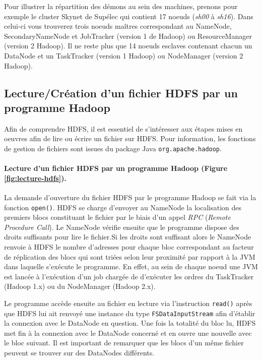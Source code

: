 \par Pour illustrer la répartition des démons au sein des machines, prenons pour exemple le cluster Skynet de Supélec qui contient 17 noeuds (\textit{sh00} à \textit{sh16}). Dans celui-ci vous trouverez trois noeuds maîtres correspondant au NameNode, SecondaryNameNode et JobTracker (version 1 de Hadoop) ou ResourceManager (version 2 Hadoop). Il ne reste plus que 14 noeuds esclaves contenant chacun un DataNode et un TaskTracker (version 1 Hadoop) ou NodeManager (version 2 Hadoop).

\subsection{Lecture/Création d'un fichier HDFS par un programme Hadoop}

\par Afin de comprendre HDFS, il est essentiel de s'intéresser aux étapes mises en oeuvres afin de lire ou écrire un fichier sur HDFS. Pour information, les fonctions de gestion de fichiers sont issues du package Java \texttt{org.apache.hadoop}.

\paragraph{Lecture d'un fichier HDFS par un programme Hadoop (Figure \ref{fig:lecture-hdfs}).}La demande d'ouverture du fichier HDFS par le programme Hadoop se fait via la fonction \texttt{open()}. HDFS se charge d'envoyer au NameNode la localisation des premiers blocs constituant le fichier par le biais d'un appel \textit{RPC} (\textit{Remote Procedure Call}). Le NameNode vérifie ensuite que le programme dispose des droits suffisants pour lire le fichier.Si les droits sont suffisant alors le NameNode renvoie à HDFS le nombre d'adresses pour chaque bloc correspondant au facteur de réplication des blocs qui sont triées selon leur proximité par rapport à la JVM dans laquelle s'exécute le programme. En effet, au sein de chaque noeud une JVM est lancée à l'exécution d'un job chargée de d'exécuter les ordres du TaskTracker (Hadoop 1.x) ou du NodeManager (Hadoop 2.x). 

\par Le programme accède ensuite au fichier en lecture via l'instruction \texttt{read()} après que HDFS lui ait renvoyé une instance du type \texttt{FSDataInputStream} afin d'établir la connexion avec le DataNode en question. Une fois la totalité du bloc lu, HDFS met fin à la connexion avec le DataNode concerné et en ouvre une nouvelle avec le bloc suivant. Il est important de remarquer que les blocs d'un même fichier peuvent se trouver sur des DataNodes différents.

